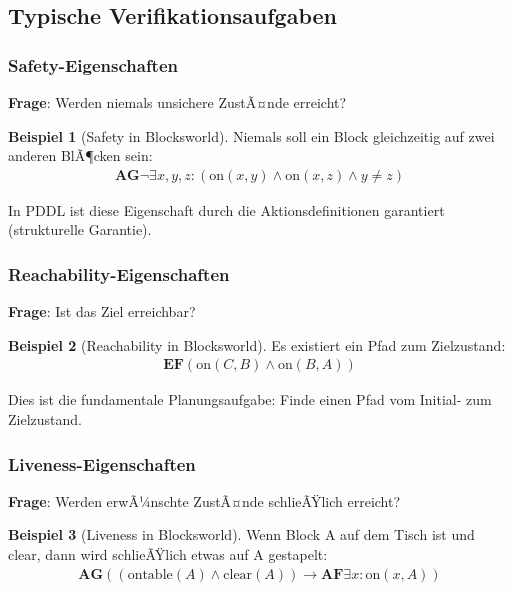 ﻿\documentclass[a4paper,12pt]{article}
\theoremstyle{definition}
\newtheorem{beispiel}{Beispiel}[section]
\begin{document}
\subsection{Typische Verifikationsaufgaben}

\subsubsection{Safety-Eigenschaften}

\textbf{Frage}: Werden niemals unsichere ZustÃ¤nde erreicht?

\begin{beispiel}[Safety in Blocksworld]
	Niemals soll ein Block gleichzeitig auf zwei anderen BlÃ¶cken sein:
	\begin{align}
	\mathbf{AG}\neg\exists x, y, z: (\text{on}(x,y) \land \text{on}(x,z) \land y \neq z)
	\end{align}
\end{beispiel}

In PDDL ist diese Eigenschaft durch die Aktionsdefinitionen garantiert (strukturelle Garantie).

\subsubsection{Reachability-Eigenschaften}

\textbf{Frage}: Ist das Ziel erreichbar?

\begin{beispiel}[Reachability in Blocksworld]
	Es existiert ein Pfad zum Zielzustand:
	\begin{align}
	\mathbf{EF}(\text{on}(C, B) \land \text{on}(B, A))
	\end{align}
\end{beispiel}

Dies ist die fundamentale Planungsaufgabe: Finde einen Pfad vom Initial- zum Zielzustand.

\subsubsection{Liveness-Eigenschaften}

\textbf{Frage}: Werden erwÃ¼nschte ZustÃ¤nde schlieÃŸlich erreicht?

\begin{beispiel}[Liveness in Blocksworld]
	Wenn Block A auf dem Tisch ist und clear, dann wird schlieÃŸlich etwas auf A gestapelt:
	\begin{align}
	\mathbf{AG}((\text{ontable}(A) \land \text{clear}(A)) \to \mathbf{AF}\exists x: \text{on}(x, A))
	\end{align}
\end{beispiel}
\end{document}
